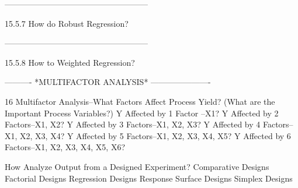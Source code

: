 -----------------------------------------------------
 
15.5.7
How do Robust Regression?
 
-----------------------------------------------------
 
15.5.8
How to Weighted Regression?
 
 
 
 
 
 
----------  *MULTIFACTOR ANALYSIS*  ----------------------
 
16
Multifactor Analysis--What Factors Affect Process Yield?
(What are the Important Process Variables?)
   Y Affected by 1 Factor --X1?
   Y Affected by 2 Factors--X1, X2?
   Y Affected by 3 Factors--X1, X2, X3?
   Y Affected by 4 Factors--X1, X2, X3, X4?
   Y Affected by 5 Factors--X1, X2, X3, X4, X5?
   Y Affected by 6 Factors--X1, X2, X3, X4, X5, X6?
 
How Analyze Output from a Designed Experiment?
   Comparative Designs
   Factorial Designs
   Regression Designs
   Response Surface Designs
   Simplex Designs
 
 
 
 
 
 
 
 
 
 
 
 
 
 
 
 
 
 
 
 
 
 
 
 
 
 
 
 
 
 
 
 
 
 
 
 
 
 
 
 
 
 
 
 
 
 
 
 
 
 
 
 
 
 
 
 
 
 
 
 
 
 
 
 
 
 
 
 
 
